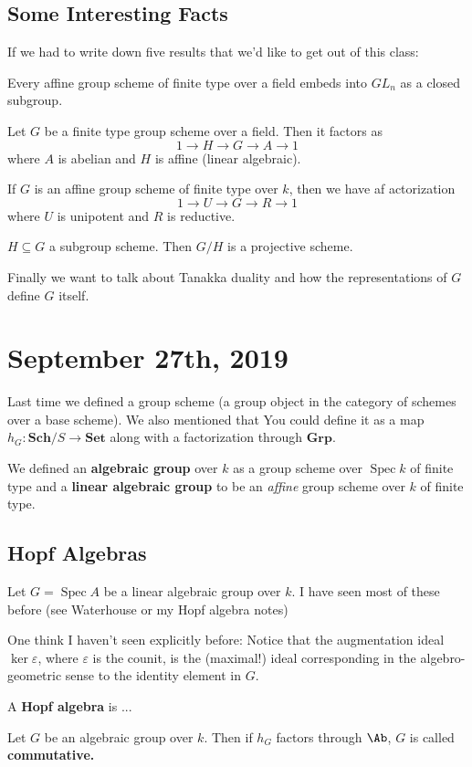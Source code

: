 \documentclass[12pt]{article}
\DeclareMathOperator{\1}{\mathbbm{1}}
\DeclareMathOperator{\Spec}{Spec}
\begin{document}
\subsection{Some Interesting Facts}
If we had to write down five results that we'd like to get out of this class:
\begin{prop}
	Every affine group scheme of finite type over a field embeds into $GL_n$ as a closed subgroup.
\end{prop}
\begin{thm}
	Let $G$ be a finite type group scheme over a field. Then it factors as 
	\[1\to H\to G\to A\to 1\]
	where $A$ is abelian and $H$ is affine (linear algebraic).
\end{thm}
\begin{prop}
	If $G$ is an affine group scheme of finite type over $k$, then we have af actorization
	\[1\to U\to G\to R\to 1\]
	where $U$ is unipotent and $R$ is reductive.
\end{prop}
\begin{prop}
	$H\subseteq G$  a subgroup scheme. Then $G/H$ is a projective scheme.
\end{prop}
Finally we want to talk about Tanakka duality and how the representations of $G$ define $G$ itself.

\section{September 27th, 2019}
Last time we defined a group scheme (a group object in the category of schemes over a base scheme). We also mentioned that 
You could define it as a map $h_G:\mathbf{Sch}/S\to \mathbf{Set}$ along with a factorization through $\mathbf{Grp}$.

We defined an \textbf{algebraic group} over $k$ as a group scheme over $\operatorname{Spec} k$ of finite type and a \textbf{linear algebraic group}
to be an \textit{affine} group scheme over $k$ of finite type.

\subsection{Hopf Algebras}
Let $G=\Spec A$ be a linear algebraic group over $k$. I have seen most of these before (see Waterhouse or my Hopf algebra notes)
\begin{rmk}
	One think I haven't seen explicitly before: Notice that the augmentation ideal $\ker \varepsilon$, where $\varepsilon$ is the counit,
	is the (maximal!) ideal corresponding in the algebro-geometric sense to the identity element in $G$.
\end{rmk}
\begin{defn}
	A \textbf{Hopf algebra} is ...
\end{defn}
\begin{defn}
	Let $G$ be an algebraic group over $k$. Then if $h_G$ factors through $\Ab$, $G$ is called \textbf{commutative.}
\end{defn}
\end{document}
